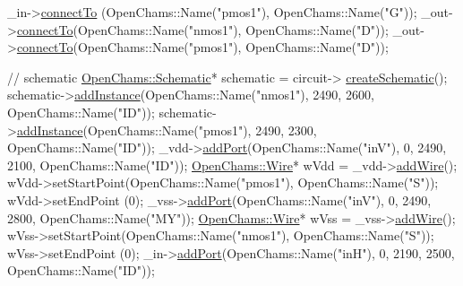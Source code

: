 \begin{DoxyCodeInclude}
    \_in->\mbox{\hyperlink{class_open_chams_1_1_net_a40c2c019175ba3bfa4b90f4ad5d06483}{connectTo}} (OpenChams::Name(\textcolor{stringliteral}{"pmos1"}), OpenChams::Name(\textcolor{stringliteral}{"G"}));
    \_out->\mbox{\hyperlink{class_open_chams_1_1_net_a40c2c019175ba3bfa4b90f4ad5d06483}{connectTo}}(OpenChams::Name(\textcolor{stringliteral}{"nmos1"}), OpenChams::Name(\textcolor{stringliteral}{"D"}));
    \_out->\mbox{\hyperlink{class_open_chams_1_1_net_a40c2c019175ba3bfa4b90f4ad5d06483}{connectTo}}(OpenChams::Name(\textcolor{stringliteral}{"pmos1"}), OpenChams::Name(\textcolor{stringliteral}{"D"}));

    \textcolor{comment}{// schematic}
    \mbox{\hyperlink{class_open_chams_1_1_schematic}{OpenChams::Schematic}}* schematic = circuit->
      \mbox{\hyperlink{class_open_chams_1_1_circuit_a57a79a9916df4512648bb195decb7250}{createSchematic}}();
    schematic->\mbox{\hyperlink{class_open_chams_1_1_schematic_ac7fc9f5cdf1e22c53d42e6606e1af8ef}{addInstance}}(OpenChams::Name(\textcolor{stringliteral}{"nmos1"}), 2490, 2600, OpenChams::Name(\textcolor{stringliteral}{"ID"}));
    schematic->\mbox{\hyperlink{class_open_chams_1_1_schematic_ac7fc9f5cdf1e22c53d42e6606e1af8ef}{addInstance}}(OpenChams::Name(\textcolor{stringliteral}{"pmos1"}), 2490, 2300, OpenChams::Name(\textcolor{stringliteral}{"ID"}));
    \_vdd->\mbox{\hyperlink{class_open_chams_1_1_net_af395a7c9d6f3c2b24500b91260873664}{addPort}}(OpenChams::Name(\textcolor{stringliteral}{"inV"}), 0, 2490, 2100, OpenChams::Name(\textcolor{stringliteral}{"ID"}));
    \mbox{\hyperlink{class_open_chams_1_1_wire}{OpenChams::Wire}}* wVdd = \_vdd->\mbox{\hyperlink{class_open_chams_1_1_net_a643a969f62770301b8b70ed63c36a55e}{addWire}}();
    wVdd->setStartPoint(OpenChams::Name(\textcolor{stringliteral}{"pmos1"}), OpenChams::Name(\textcolor{stringliteral}{"S"}));
    wVdd->setEndPoint  (0);
    \_vss->\mbox{\hyperlink{class_open_chams_1_1_net_af395a7c9d6f3c2b24500b91260873664}{addPort}}(OpenChams::Name(\textcolor{stringliteral}{"inV"}), 0, 2490, 2800, OpenChams::Name(\textcolor{stringliteral}{"MY"}));
    \mbox{\hyperlink{class_open_chams_1_1_wire}{OpenChams::Wire}}* wVss = \_vss->\mbox{\hyperlink{class_open_chams_1_1_net_a643a969f62770301b8b70ed63c36a55e}{addWire}}();
    wVss->setStartPoint(OpenChams::Name(\textcolor{stringliteral}{"nmos1"}), OpenChams::Name(\textcolor{stringliteral}{"S"}));
    wVss->setEndPoint  (0);
    \_in->\mbox{\hyperlink{class_open_chams_1_1_net_af395a7c9d6f3c2b24500b91260873664}{addPort}}(OpenChams::Name(\textcolor{stringliteral}{"inH"}), 0, 2190, 2500, OpenChams::Name(\textcolor{stringliteral}{"ID"}));

\end{DoxyCodeInclude}
